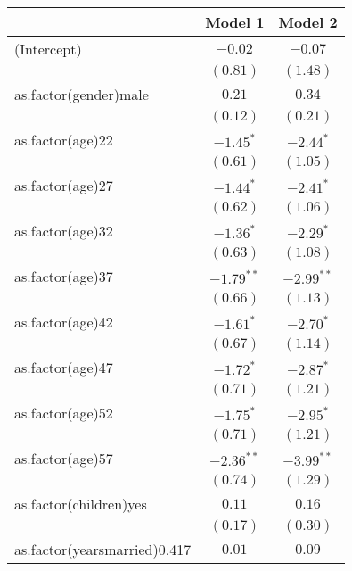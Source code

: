 
\begin{table}[hb!]
\begin{center}
\begin{tabular}{l c c }
\toprule
 & Model 1 & Model 2 \\
\midrule
(Intercept)                  & $-0.02$      & $-0.07$      \\
                             & $(0.81)$     & $(1.48)$     \\
as.factor(gender)male        & $0.21$       & $0.34$       \\
                             & $(0.12)$     & $(0.21)$     \\
as.factor(age)22             & $-1.45^{*}$  & $-2.44^{*}$  \\
                             & $(0.61)$     & $(1.05)$     \\
as.factor(age)27             & $-1.44^{*}$  & $-2.41^{*}$  \\
                             & $(0.62)$     & $(1.06)$     \\
as.factor(age)32             & $-1.36^{*}$  & $-2.29^{*}$  \\
                             & $(0.63)$     & $(1.08)$     \\
as.factor(age)37             & $-1.79^{**}$ & $-2.99^{**}$ \\
                             & $(0.66)$     & $(1.13)$     \\
as.factor(age)42             & $-1.61^{*}$  & $-2.70^{*}$  \\
                             & $(0.67)$     & $(1.14)$     \\
as.factor(age)47             & $-1.72^{*}$  & $-2.87^{*}$  \\
                             & $(0.71)$     & $(1.21)$     \\
as.factor(age)52             & $-1.75^{*}$  & $-2.95^{*}$  \\
                             & $(0.71)$     & $(1.21)$     \\
as.factor(age)57             & $-2.36^{**}$ & $-3.99^{**}$ \\
                             & $(0.74)$     & $(1.29)$     \\
as.factor(children)yes       & $0.11$       & $0.16$       \\
                             & $(0.17)$     & $(0.30)$     \\
as.factor(yearsmarried)0.417 & $0.01$       & $0.09$       \\

\end{tabular}
\end{center}
\end{table}
